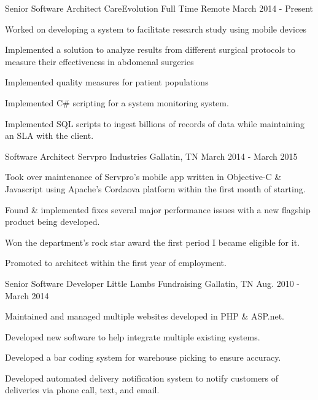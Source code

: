 \begin{cventries}
  \cventry
    {Senior Software Architect}
    {CareEvolution}
    {Full Time Remote}
    {March 2014 - Present}
    {
      \begin{cvitems}
      	\item {Worked on developing a system to facilitate research study using mobile devices}
      	\item {Implemented a solution to analyze results from different surgical protocols to measure their effectiveness in abdomenal surgeries}
      	\item {Implemented quality measures for patient populations}
        \item {Implemented C\# scripting for a system monitoring system.}
        \item {Implemented SQL scripts to ingest billions of records of data while maintaining an SLA with the client.}
      \end{cvitems}
    }
  \cventry
    {Software Architect}
    {Servpro Industries}
    {Gallatin, TN}
    {March 2014 - March 2015}
    {
      \begin{cvitems}
        \item {Took over maintenance of Servpro's mobile app written in Objective-C \& Javascript using Apache's Cordaova platform within the first month of starting.}
        \item {Found \& implemented fixes several major performance issues with a new flagship product being developed.}
        \item {Won the department's rock star award the first period I became eligible for it.}
        \item {Promoted to architect within the first year of employment.}
      \end{cvitems}
    }
  \cventry
    {Senior Software Developer}
    {Little Lambs Fundraising}
    {Gallatin, TN}
    {Aug. 2010 - March 2014}
    {
      \begin{cvitems}
        \item {Maintained and managed multiple websites developed in PHP \& ASP.net.}
        \item {Developed new software to help integrate multiple existing systems.}
        \item {Developed a bar coding system for warehouse picking to ensure accuracy.}
        \item {Developed automated delivery notification system to notify customers of deliveries via phone call, text, and email.}

\end{cvitems}}
\end{cventries}
